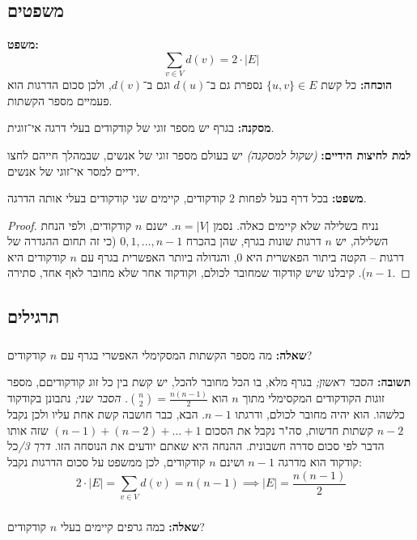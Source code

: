 \documentclass[]{article}
\begin{document}
	\subsection{משפטים}
	\textbf{משפט: }
	\[ \sum_{v \in V}d(v) = 2 \cdot |E| \]
	\textbf{הוכחה: }כל קשת $\{u, v\} \in E$ נספרת גם ב־$d(u)$ וגם ב־$d(v)$, ולכן סכום הדרגות הוא פעמיים מספר הקשתות. 
	
	\textbf{מסקנה: }בגרף יש מספר זוגי של קודקודים בעלי דרגה אי־זוגית. 
	
	\textbf{למת לחיצות הידיים: }\textit{(שקול למסקנה)} יש בעולם מספר זוגי של אנשים, שבמהלך חייהם לחצו ידיים למסר אי־זוגי של אנשים. 
	
	\textbf{משפט: }בכל דרף בעל לפחות $2$ קודקודים, קיימים שני קודקודים בעלי אותה הדרגה. 
	\begin{proof}
		נניח בשלילה שלא קיימים כאלה. נסמן $n = |V|$. ישנם $n$ קודקודים, ולפי הנחת השלילה, יש $n$ דרגות שונות בגרף, שהן בהכרח $0, 1, \dots, n - 1$ (כי זה תחום ההגדרה של דרגות – הקטה ביתור הפאשרית היא $0$, והגדולה ביותר האפשרית בגרף עם $n$ קודקודים היא $n - 1$). קיבלנו שיש קודקוד שמחובר לכולם, וקודקוד אחר שלא מחובר לאף אחד, סתירה. 
	\end{proof}
	\subsection{תרגילים}
	\subsubsection{}
	
	\textbf{שאלה: }מה מספר הקשתות המסקימלי האפשרי בגרף עם $n$ קודקודים?
	
	\textbf{תשובה: }\textit{הסבר ראשון; }בגרף מלא, בו הכל מחובר להכל, יש קשת בין כל זוג קודקודיםם, מספר זוגות הקודקודים המקסימלי מתוך $n$ הוא $\binom{n}{2} = \frac{n(n - 1)}{2}$. \textit{הסבר שני; }נתבונן בקודקוד כלשהו. הוא יהיה מחובר לכולם, ודרגתו $n - 1$. הבא, כבר חושבה קשת אחת עליו ולכן נקבל $n - 2$ קשתות חדשות, סה"ר נקבל את הסכום $(n -1) + (n - 2) + \dots + 1$ שזה אותו הדבר לפי סכום סדרה חשבונית. ההנחה היא שאתם יודעים את הנוסחה הזו. \textit{דרך 3/}כל קודקוד הוא מדרגה $n - 1$ ושינם $n$ קודקודים, לכן ממשפט על סכום הדרגות נקבל: 
	\[ 2 \cdot |E| = \sum_{v \in V} d(v) = n(n - 1) \implies |E| = \frac{n(n - 1)}{2} \]
	
	\subsubsection{}
	\textbf{שאלה: }כמה גרפים קיימים בעלי $n$ קודקודים?
	
\end{document}
